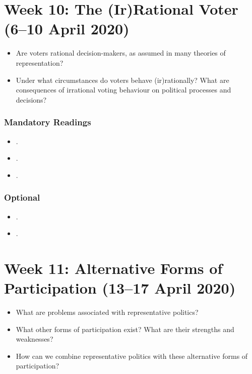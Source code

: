 \documentclass[abstract=on,parskip=full,headings=standardclasses,fontsize=11pt,paper=a4]{scrartcl}
\begin{document}
 
\section{Week 10: The (Ir)Rational Voter (6--10 April 2020)}


\begin{itemize}
\renewcommand\labelitemi{--}
\item Are voters rational decision-makers, as assumed in many theories of representation? 
\item Under what circumstances do voters behave (ir)rationally? What are consequences of irrational voting behaviour on political processes and decisions?
\end{itemize}


\subsubsection*{Mandatory Readings}


 \begin{itemize}
\item {}.
\item {}.
\item {}.
\end{itemize}

\subsubsection*{Optional}
\begin{itemize}
\item {}.
\item {}.
\end{itemize}



\section{Week 11: Alternative Forms of Participation (13--17 April 2020)}

\begin{itemize}
\renewcommand\labelitemi{--}
\item What are problems associated with representative politics?
\item What other forms of participation exist? What are their strengths and weaknesses?
\item How can we combine representative politics with these alternative forms of participation?
\end{itemize}
\end{document}
